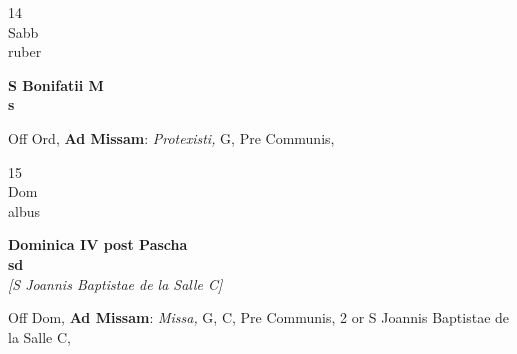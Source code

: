 \documentclass[10pt, openany]{book}
\begin{document}
        \begin{center}
            \begin{minipage}{3.5in}
                \vspace{2em}
                \begin{minipage}{0.5in}
                    {\Huge 14} \\
                    {\normalsize Sabb} \\
                    {\normalsize ruber}
                \end{minipage}
                \begin{minipage}{3.0in}
                    \textbf{ \large S Bonifatii M \\
                    \textnormal{\normalsize s}} \\ 
                \end{minipage}
                \begin{justify}Off Ord, \textbf{Ad Missam}: \textit{Protexisti,} G, Pre Communis,  
                \end{justify}
            \end{minipage}
        \end{center}
    
        \begin{center}
            \begin{minipage}{3.5in}
                \vspace{2em}
                \begin{minipage}{0.5in}
                    {\Huge 15} \\
                    {\normalsize Dom} \\
                    {\normalsize albus}
                \end{minipage}
                \begin{minipage}{3.0in}
                    \textbf{ \large Dominica IV post Pascha \\
                    \textnormal{\normalsize sd}} \\ \textit{[S Joannis Baptistae de la Salle C]} \\ 
                \end{minipage}
                \begin{justify}Off Dom, \textbf{Ad Missam}: \textit{Missa,} G, C, Pre Communis, 2 or S Joannis Baptistae de la Salle C,  
                \end{justify}
            \end{minipage}
        \end{center}
    
\end{document}
